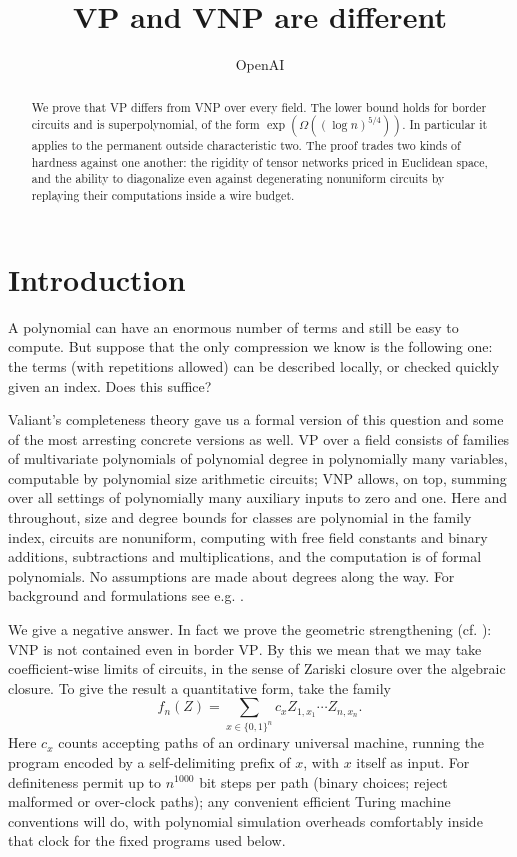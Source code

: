 \documentclass[11pt,letterpaper]{article}
\title{VP and VNP are different}
\author{OpenAI}
\date{}
\theoremstyle{definition}
\numberwithin{equation}{section}
\begin{document}
\maketitle
\begin{abstract}
We prove that VP differs from VNP over every field. The lower bound holds for
border circuits and is superpolynomial, of the form $\exp(\Omega((\log n)^{5/4}))$. In particular
it applies to the permanent outside characteristic two. The proof trades two kinds of
hardness against one another: the rigidity of tensor networks priced in Euclidean space,
and the ability to diagonalize even against degenerating nonuniform circuits by replaying
their computations inside a wire budget.
\end{abstract}

\tableofcontents
\clearpage

\section{Introduction}\label{sec:introduction}

A polynomial can have an enormous number of terms and still be easy to compute. But
suppose that the only compression we know is the following one: the terms (with repetitions
allowed) can be described locally, or checked quickly given an index. Does this suffice?

Valiant's completeness theory \cite{Valiant,ValiantProjections} gave us a formal version of this question and
some of the most arresting concrete versions as well. $\mathrm{VP}$ over a field consists of families of
multivariate polynomials of polynomial degree in polynomially many variables, computable
by polynomial size arithmetic circuits; $\mathrm{VNP}$ allows, on top, summing over all settings of
polynomially many auxiliary inputs to zero and one. Here and throughout, size and degree
bounds for classes are polynomial in the family index, circuits are nonuniform, computing
with free field constants and binary additions, subtractions and multiplications, and the
computation is of formal polynomials. No assumptions are made about degrees along the
way. For background and formulations see e.g. \cite{BCS,Burgisser,BC2024,ShpilkaYehudayoff,BLMW}.

We give a negative answer. In fact we prove the geometric strengthening (cf. \cite{ApproxFactors}): $\mathrm{VNP}$
is not contained even in border $\mathrm{VP}$. By this we mean that we may take coefficient-wise
limits of circuits, in the sense of Zariski closure over the algebraic closure. To give the result
a quantitative form, take the family
\[
  f_n(Z) = \sum_{x\in\{0,1\}^n} c_x Z_{1,x_1}\cdots Z_{n,x_n}.
\]
Here $c_x$ counts accepting paths of an ordinary universal machine, running the program
encoded by a self-delimiting prefix of $x$, with $x$ itself as input. For definiteness permit
up to $n^{1000}$ bit steps per path (binary choices; reject malformed or over-clock paths);
any convenient efficient Turing machine conventions will do, with polynomial simulation
overheads comfortably inside that clock for the fixed programs used below.
\end{document}
